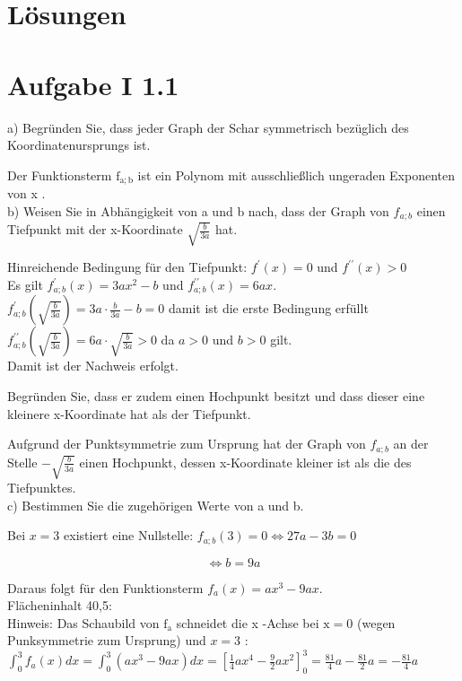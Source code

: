\documentclass[10pt]{article}
\begin{document}
\section*{Lösungen}
\section*{Aufgabe I 1.1}
a) Begründen Sie, dass jeder Graph der Schar symmetrisch bezüglich des Koordinatenursprungs ist.

Der Funktionsterm $\mathrm{f}_{\mathrm{a} ; \mathrm{b}}$ ist ein Polynom mit ausschließlich ungeraden Exponenten von x .\\
b) Weisen Sie in Abhängigkeit von a und b nach, dass der Graph von $f_{a ; b}$ einen Tiefpunkt mit der x-Koordinate $\sqrt{\frac{b}{3 a}}$ hat.

Hinreichende Bedingung für den Tiefpunkt: $f^{\prime}(x)=0$ und $f^{\prime \prime}(x)>0$\\
Es gilt $f_{a ; b}^{\prime}(x)=3 a x^{2}-b$ und $f_{a ; b}^{\prime \prime}(x)=6 a x$.\\
$f_{a ; b}^{\prime}\left(\sqrt{\frac{b}{3 a}}\right)=3 a \cdot \frac{b}{3 a}-b=0$ damit ist die erste Bedingung erfüllt\\
$f_{a ; b}^{\prime \prime}\left(\sqrt{\frac{b}{3 a}}\right)=6 a \cdot \sqrt{\frac{b}{3 a}}>0$ da $a>0$ und $b>0$ gilt.\\
Damit ist der Nachweis erfolgt.

Begründen Sie, dass er zudem einen Hochpunkt besitzt und dass dieser eine kleinere x-Koordinate hat als der Tiefpunkt.

Aufgrund der Punktsymmetrie zum Ursprung hat der Graph von $f_{a ; b}$ an der Stelle $-\sqrt{\frac{b}{3 a}}$ einen Hochpunkt, dessen x-Koordinate kleiner ist als die des Tiefpunktes.\\
c) Bestimmen Sie die zugehörigen Werte von a und b.

Bei $x=3$ existiert eine Nullstelle: $f_{a ; b}(3)=0 \Leftrightarrow 27 a-3 b=0$

$$
\Leftrightarrow b=9 a
$$

Daraus folgt für den Funktionsterm $f_{a}(x)=a x^{3}-9 a x$.\\
Flächeninhalt 40,5:\\
Hinweis: Das Schaubild von $\mathrm{f}_{\mathrm{a}}$ schneidet die x -Achse bei $\mathrm{x}=0$ (wegen\\
Punksymmetrie zum Ursprung) und $x=3$ :\\
$\int_{0}^{3} f_{a}(x) d x=\int_{0}^{3}\left(a x^{3}-9 a x\right) d x=\left[\frac{1}{4} a x^{4}-\frac{9}{2} a x^{2}\right]_{0}^{3}=\frac{81}{4} a-\frac{81}{2} a=-\frac{81}{4} a$
\end{document}
